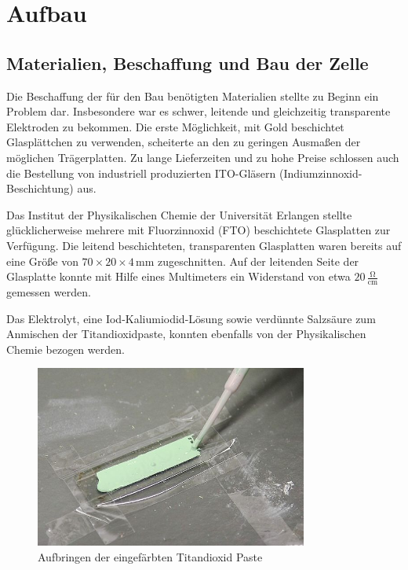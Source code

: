 \documentclass[11pt]{scrartcl}
\newcommand{\unit}[1]{\ensuremath{\,\mathrm{#1}}} %
\begin{document}
\section{Aufbau}
\subsection{Materialien, Beschaffung und Bau der Zelle}
Die Beschaffung der f\"ur den Bau ben\"otigten Materialien stellte zu Beginn ein Problem dar. Insbesondere war es schwer, leitende und gleichzeitig transparente Elektroden zu bekommen. Die erste M\"oglichkeit, mit Gold beschichtet Glaspl\"attchen zu verwenden, scheiterte an den zu geringen Ausma\ss{}en der m\"oglichen Tr\"agerplatten. Zu lange Lieferzeiten und zu hohe Preise schlossen auch die Bestellung von industriell produzierten ITO-Gl\"asern (Indiumzinnoxid-Beschichtung) aus.

Das Institut der Physikalischen Chemie der Universit\"at Erlangen stellte gl\"ucklicherweise mehrere mit Fluorzinnoxid (FTO) beschichtete Glasplatten zur Verf\"ugung. Die leitend beschichteten, transparenten Glasplatten waren bereits auf eine Gr\"o\ss{}e von \(70\times 20 \times 4 \unit{mm}\) zugeschnitten. Auf der leitenden Seite der Glasplatte konnte mit Hilfe eines Multimeters ein Widerstand von etwa \(20 \unit{\frac{\Omega}{cm}}\) gemessen werden.

Das Elektrolyt, eine Iod-Kaliumiodid-L\"osung sowie verd\"unnte Salzs\"aure zum Anmischen der Titandioxidpaste, konnten ebenfalls von der Physikalischen Chemie bezogen werden.

\begin{figure}[ht]
\begin{center}
\includegraphics[width=0.8\textwidth]{images/herstellung_pipette.jpg}
\end{center}
\vspace{-1.5\baselineskip}
\caption{Aufbringen der eingefärbten Titandioxid Paste}
\label{herstellung_pipette}
\end{figure}
\end{document}
